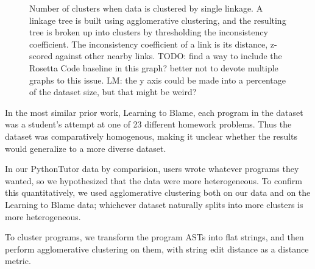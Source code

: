 \documentclass[conference]{IEEEtran}
\begin{document}
\begin{figure}
\caption{Number of clusters when data is clustered by single linkage.
  A linkage tree is built using agglomerative clustering, and the resulting tree is broken up
  into clusters by thresholding the inconsistency coefficient. The inconsistency coefficient
  of a link is its distance, z-scored against other nearby links. TODO: find a way to include
  the Rosetta Code baseline in this graph? better not to devote multiple graphs to this issue.
  LM: the y axis could be made into a percentage of the dataset size, but that might be
  weird?}
\label{fig-diversity}
\end{figure}

In the most similar prior work, Learning to Blame, each program in the dataset
was a student's attempt at one of 23 different homework problems. Thus the
dataset was comparatively homogenous, making it unclear whether the results
would generalize to a more diverse dataset.

In our PythonTutor data by comparision, users wrote whatever programs they
wanted, so we
hypothesized that the data were more heterogeneous. To confirm this
quantitatively, we used agglomerative clustering both on our
data and on the Learning to Blame data; whichever dataset naturally splits
into more clusters is more heterogeneous.


To cluster programs, we transform the program ASTs into flat strings, and then
perform agglomerative clustering on them, with string edit distance as a distance
metric.
\end{document}

